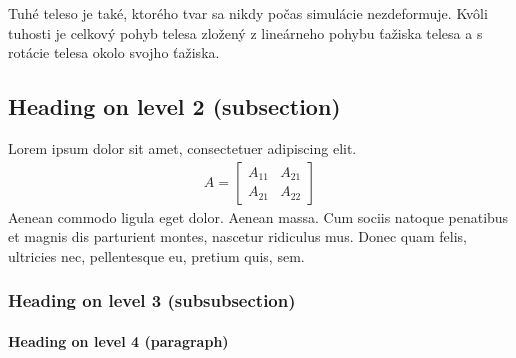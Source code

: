 \documentclass[paper=a4, fontsize=11pt]{scrartcl} %
\numberwithin{equation}{section} %
\numberwithin{figure}{section} %
\numberwithin{table}{section} %
\begin{document}
Tuhé teleso je také, ktorého tvar sa nikdy počas simulácie nezdeformuje. Kvôli tuhosti je
celkový pohyb telesa zložený z lineárneho pohybu ťažiska telesa a s rotácie telesa okolo
svojho ťažiska.






































\subsection{Heading on level 2 (subsection)}

Lorem ipsum dolor sit amet, consectetuer adipiscing elit. 
\begin{align}
A = 
\begin{bmatrix}
A_{11} & A_{21} \\
A_{21} & A_{22}
\end{bmatrix}
\end{align}
Aenean commodo ligula eget dolor. Aenean massa. Cum sociis natoque penatibus et magnis dis parturient montes, nascetur ridiculus mus. Donec quam felis, ultricies nec, pellentesque eu, pretium quis, sem.


\subsubsection{Heading on level 3 (subsubsection)}

\lipsum[3] %

\paragraph{Heading on level 4 (paragraph)}

\lipsum[6] %
\end{document}
